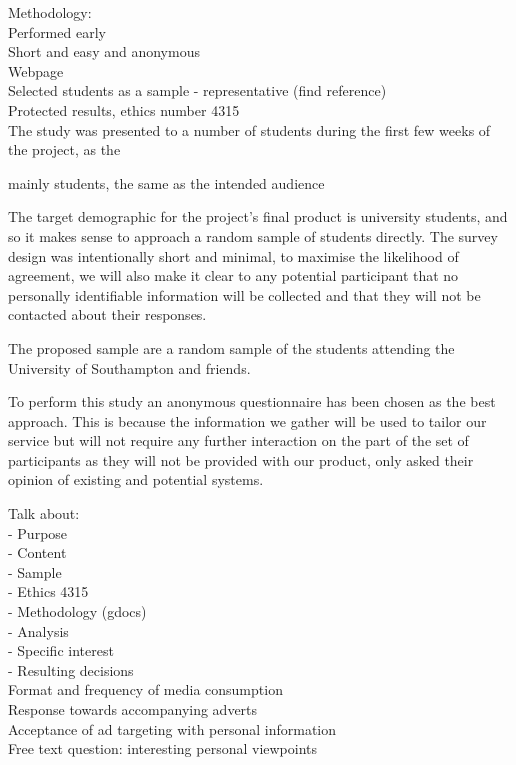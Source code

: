 Methodology:\\
Performed early\\
Short and easy and anonymous\\
Webpage\\
Selected students as a sample - representative (find reference)\\
Protected results, ethics number 4315\\



The study was presented to a number of students during the first few weeks of the project, as the 

mainly students, the same as the intended audience


The target demographic for the project's final product is university students, and so it makes sense to approach a random sample of students directly. The survey design was intentionally short and minimal, to maximise the likelihood of agreement, we will also make it clear to any potential participant that no personally identifiable information will be collected and that they will not be contacted about their responses. %

The proposed sample are a random sample of the students attending the University of Southampton and friends.


To perform this study an anonymous questionnaire has been chosen as the best approach. This is because the information we gather will be used to tailor our service but will not require any further interaction on the part of the set of participants as they will not be provided with our product, only asked their opinion of existing and potential systems.



Talk about:\\
 - Purpose\\
 - Content\\
 - Sample\\
 - Ethics 4315\\
 - Methodology (gdocs)\\
 - Analysis\\
  - Specific interest\\
  - Resulting decisions\\


Format and frequency of media consumption\\
Response towards accompanying adverts\\
Acceptance of ad targeting with personal information\\
Free text question: interesting personal viewpoints\\





